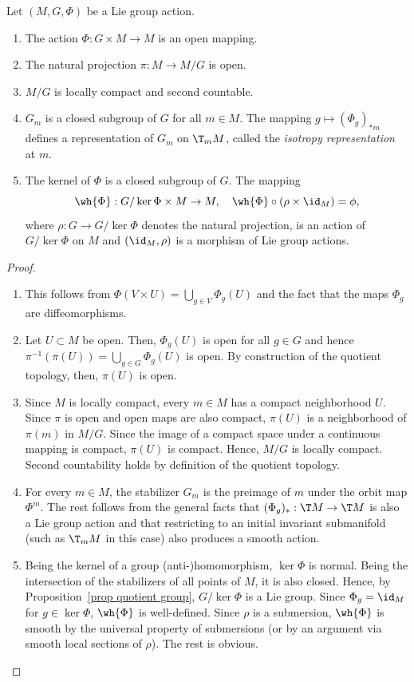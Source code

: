 \begin{prop}[{{\cite[Prop.~6.1.5]{RS1}}}]\label{prop 6.1.5 RS1}
    Let $(M,G,\Phi)$ be a Lie group action.
    \begin{enumerate}
        \item The action $\Phi:G\times M\to M$ is an open mapping.
        \item The natural projection $\pi:M\to M\slash G$ is open.
        \item $M\slash G$ is locally compact and second countable.
        \item $G_m$ is a closed subgroup of $G$ for all $m\in M$. The mapping $g\mapsto (\Phi_g)_{\ast m}$ defines a representation of $G_m$ on $\T_mM$, called the \emph{isotropy representation} at $m$.
        \item The kernel of $\Phi$ is a closed subgroup of $G$. The mapping
        \[\wh{\Phi}:G\slash \ker \Phi\times M\to M,\quad \wh{\Phi}\circ(\rho\times\id_M)=\phi,\]
        where $\rho:G\to G\slash\ker\Phi$ denotes the natural projection, is an action of $G\slash\ker\Phi$ on $M$ and $(\id_M,\rho)$ is a morphism of Lie group actions.
    \end{enumerate}
\end{prop}
\begin{proof}
    \begin{enumerate}
        \item This follows from $\Phi(V\times U)=\bigcup_{g\in V}\Phi_g(U)$ and the fact that the maps $\Phi_g$ are diffeomorphisms.
        \item Let $U\subset M$ be open. Then, $\Phi_g(U)$ is open for all $g\in G$ and hence $\pi^{-1}(\pi(U))=\bigcup_{g\in G}\Phi_g(U)$ is open. By construction of the quotient topology, then, $\pi(U)$ is open.
        \item Since $M$ is locally compact, every $m\in M$ has a compact neighborhood $U$. Since $\pi$ is open and open maps are also compact, $\pi(U)$ is a neighborhood of $\pi(m)$ in $M\slash G$. Since the image of a compact space under a continuous mapping is compact, $\pi(U)$ is compact. Hence, $M\slash G$ is locally compact. Second countability holds by definition of the quotient topology.
        \item For every $m\in M$, the stabilizer $G_m$ is the preimage of $m$ under the orbit map $\Phi^m$. The rest follows from the general facts that $(\Phi_g)_{\ast}:\T M\to \T M$ is also a Lie group action and that restricting to an initial invariant submanifold (such as $\T_mM$ in this case) also produces a smooth action.
        \item Being the kernel of a group (anti-)homomorphism, $\ker\Phi$ is normal. Being the intersection of the stabilizers of all points of $M$, it is also closed. Hence, by Proposition~\ref{prop quotient group}, $G\slash \ker\Phi$ is a Lie group. Since $\Phi_g=\id_M$ for $g\in\ker\Phi$, $\wh{\Phi}$ is well-defined. Since $\rho$ is a submersion, $\wh{\Phi}$ is smooth by the universal property of submersions (or by an argument via smooth local sections of $\rho$). The rest is obvious.
    \end{enumerate}
\end{proof}

